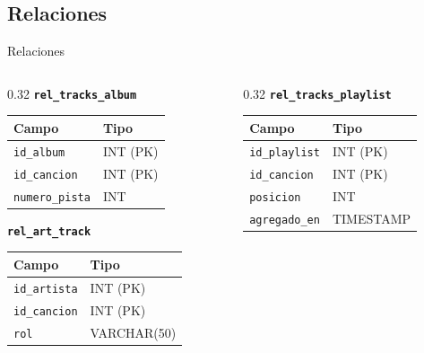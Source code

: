 \documentclass[aspectratio=169, 10pt]{beamer}
\begin{document}
\subsection{Relaciones}
\begin{frame}[t]{Relaciones}
    \centering
    \footnotesize
    \setlength{\tabcolsep}{3pt}
    \renewcommand{\arraystretch}{0.95}

    \begin{columns}[T]
        \begin{column}{0.32\textwidth}
            \centering
            \textbf{\texttt{rel\_tracks\_album}}\par\vspace{0.05cm}
            \begin{tabular}{ll}
                \toprule
                \textbf{Campo} & \textbf{Tipo} \\
                \midrule
                \texttt{id\_album} & INT (PK) \\
                \texttt{id\_cancion} & INT (PK) \\
                \texttt{numero\_pista} & INT \\
                \bottomrule
            \end{tabular}

            \vspace{0.25cm}
            \textbf{\texttt{rel\_art\_track}}\par\vspace{0.05cm}
            \begin{tabular}{ll}
                \toprule
                \textbf{Campo} & \textbf{Tipo} \\
                \midrule
                \texttt{id\_artista} & INT (PK) \\
                \texttt{id\_cancion} & INT (PK) \\
                \texttt{rol} & VARCHAR(50) \\
                \bottomrule
            \end{tabular}
        \end{column}

        \begin{column}{0.32\textwidth}
            \centering
            \textbf{\texttt{rel\_tracks\_playlist}}\par\vspace{0.05cm}
            \begin{tabular}{ll}
                \toprule
                \textbf{Campo} & \textbf{Tipo} \\
                \midrule
                \texttt{id\_playlist} & INT (PK) \\
                \texttt{id\_cancion} & INT (PK) \\
                \texttt{posicion} & INT \\
                \texttt{agregado\_en} & TIMESTAMP \\
                \bottomrule
            \end{tabular}


\end{column}
\end{columns}
\end{frame}
\end{document}
